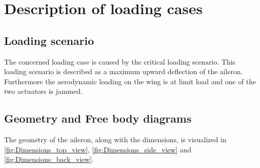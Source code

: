 \section{Description of loading cases}
\label{sec:loading}
\subsection{Loading scenario}
The concerned loading case is caused by the critical loading scenario.
This loading scenario is described as a maximum upward deflection of the aileron. Furthermore the aerodynamic loading on the wing is at limit load and one of the two actuators is jammed.


\subsection{Geometry and Free body diagrams}
The geometry of the aileron, along with the dimensions, is visualized in \ref{fig:Dimensions_top_view}, \ref{fig:Dimensions_side_view} and \ref{fig:Dimensions_back_view}.


